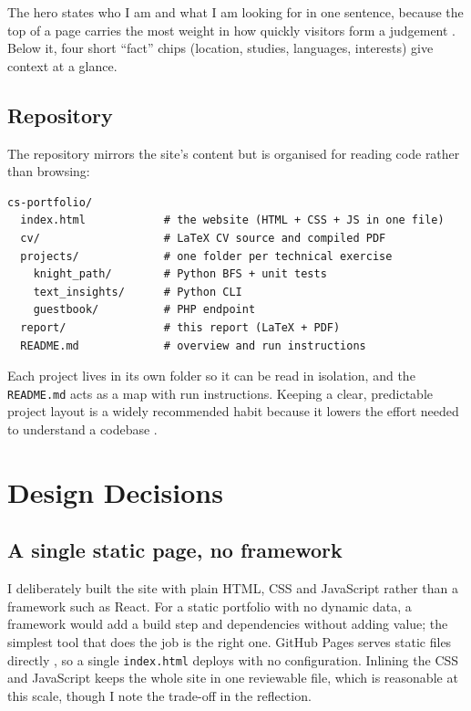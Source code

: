 \documentclass[11pt,a4paper]{article}
\begin{document}
The hero states who I am and what I am looking for in one sentence, because the top of
a page carries the most weight in how quickly visitors form a judgement
\citep{lidwell2010}. Below it, four short ``fact'' chips (location, studies, languages,
interests) give context at a glance.

\subsection{Repository}
The repository mirrors the site's content but is organised for reading code rather than
browsing:

\begin{lstlisting}
cs-portfolio/
  index.html            # the website (HTML + CSS + JS in one file)
  cv/                   # LaTeX CV source and compiled PDF
  projects/             # one folder per technical exercise
    knight_path/        # Python BFS + unit tests
    text_insights/      # Python CLI
    guestbook/          # PHP endpoint
  report/               # this report (LaTeX + PDF)
  README.md             # overview and run instructions
\end{lstlisting}

Each project lives in its own folder so it can be read in isolation, and the
\texttt{README.md} acts as a map with run instructions. Keeping a clear, predictable
project layout is a widely recommended habit because it lowers the effort needed to
understand a codebase \citep{wilson2017}.

\section{Design Decisions}

\subsection{A single static page, no framework}
I deliberately built the site with plain HTML, CSS and JavaScript rather than a
framework such as React. For a static portfolio with no dynamic data, a framework would
add a build step and dependencies without adding value; the simplest tool that does the
job is the right one. GitHub Pages serves static files directly \citep{githubpages2024},
so a single \texttt{index.html} deploys with no configuration. Inlining the CSS and
JavaScript keeps the whole site in one reviewable file, which is reasonable at this
scale, though I note the trade-off in the reflection.
\end{document}
